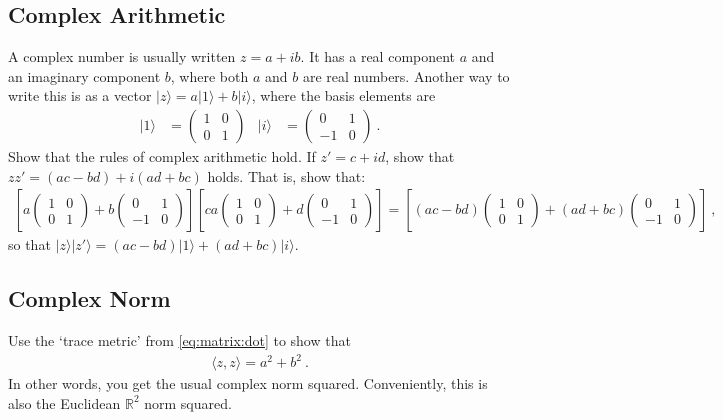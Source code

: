 \documentclass[12pt]{article}
\numberwithin{equation}{section}    %
\begin{document}
\subsection{Complex Arithmetic}
A complex number is usually written $z = a+ib$. It has a real component $a$ and an imaginary component $b$, where both $a$ and $b$ are real numbers. Another way to write this is as a vector $|z\rangle = a|1\rangle + b|i\rangle$, where the basis elements are
\begin{align}
	|1\rangle &=
	\begin{pmatrix}
		1 & 0 \\ 0 & 1
	\end{pmatrix}
	&
	|i\rangle &=
	\begin{pmatrix}
		0 & 1 \\ -1 & 0
	\end{pmatrix} \ .
\end{align}
Show that the rules of complex arithmetic hold. If $z' = c+id$, show that $zz' = (ac - bd)+ i(ad+bc)$ holds. That is, show that:
\begin{align}
	\left[a\begin{pmatrix}
		1 & 0 \\ 0 & 1
	\end{pmatrix}+ 
	b\begin{pmatrix}
		0 & 1 \\ -1 & 0
	\end{pmatrix}\right]
  \left[ca\begin{pmatrix}
		1 & 0 \\ 0 & 1
	\end{pmatrix}+ 
	d\begin{pmatrix}
		0 & 1 \\ -1 & 0
	\end{pmatrix}\right]
	=
	\left[(ac-bd)\begin{pmatrix}
		1 & 0 \\ 0 & 1
	\end{pmatrix}+ 
	(ad+bc)\begin{pmatrix}
		0 & 1 \\ -1 & 0
	\end{pmatrix}\right] \ ,
\end{align}
so that $|z\rangle |z'\rangle = (ac - bd)|1\rangle+ (ad+bc)|i\rangle$.

\subsection{Complex Norm}
Use the `trace metric' from \eqref{eq:matrix:dot} to show that 
\begin{align}
	\langle z,z\rangle = a^2 + b^2 \ .
\end{align}
In other words, you get the usual complex norm squared. Conveniently, this is also the Euclidean $\mathbb{R}^2$ norm squared. 
\end{document}

